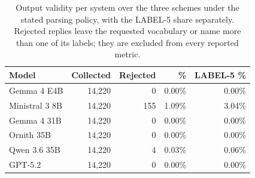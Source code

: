 \begin{table}[htbp]
\centering
\caption{Output validity per system over the three schemes under the stated parsing policy, with the LABEL-5 share separately. Rejected replies leave the requested vocabulary or name more than one of its labels; they are excluded from every reported metric.}
\label{tab:cdm_validity}
\small
\begin{tabular}{lrrrr}
\toprule
\textbf{Model} & \textbf{Collected} & \textbf{Rejected} & \textbf{\%} & \textbf{LABEL-5 \%} \\
\midrule
  Gemma 4 E4B & 14{,}220 & 0 & 0.00\% & 0.00\% \\
  Ministral 3 8B & 14{,}220 & 155 & 1.09\% & 3.04\% \\
  Gemma 4 31B & 14{,}220 & 0 & 0.00\% & 0.00\% \\
  Ornith 35B & 14{,}220 & 0 & 0.00\% & 0.00\% \\
  Qwen 3.6 35B & 14{,}220 & 4 & 0.03\% & 0.06\% \\
  GPT-5.2 & 14{,}220 & 0 & 0.00\% & 0.00\% \\
\bottomrule
\end{tabular}
\end{table}
